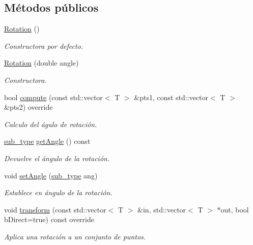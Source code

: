 \subsection*{Métodos públicos}
\begin{DoxyCompactItemize}
\item 
\hyperlink{class_i3_d_1_1_rotation_aa256156103083742ff0b09e274302a02}{Rotation} ()
\begin{DoxyCompactList}\small\item\em Constructora por defecto. \end{DoxyCompactList}\item 
\hyperlink{class_i3_d_1_1_rotation_a76e534145c6f6c81b3d519d97b3d9353}{Rotation} (double angle)
\begin{DoxyCompactList}\small\item\em Constructora. \end{DoxyCompactList}\item 
bool \hyperlink{group__trf2_d_group_gae7637f88523deb1879cf8a712820d12e}{compute} (const std\+::vector$<$ T $>$ \&pts1, const std\+::vector$<$ T $>$ \&pts2) override
\begin{DoxyCompactList}\small\item\em Calculo del águlo de rotación. \end{DoxyCompactList}\item 
\hyperlink{class_i3_d_1_1_transform_ac087b4b8b9acb1b11a6caa2231d598c7}{sub\+\_\+type} \hyperlink{class_i3_d_1_1_rotation_ae7c5193c2f47f782b8707fd8cc02078f}{get\+Angle} () const 
\begin{DoxyCompactList}\small\item\em Devuelve el ángulo de la rotación. \end{DoxyCompactList}\item 
void \hyperlink{group__trf2_d_group_gacc531b7f0f00dd34f197a5c9ba07b8e2}{set\+Angle} (\hyperlink{class_i3_d_1_1_transform_ac087b4b8b9acb1b11a6caa2231d598c7}{sub\+\_\+type} ang)
\begin{DoxyCompactList}\small\item\em Establece en ángulo de la rotación. \end{DoxyCompactList}\item 
void \hyperlink{group__trf2_d_group_ga0032788395928aa7419d506981ef03d3}{transform} (const std\+::vector$<$ T $>$ \&in, std\+::vector$<$ T $>$ $\ast$out, bool b\+Direct=true) const  override
\begin{DoxyCompactList}\small\item\em Aplica una rotación a un conjunto de puntos. \end{DoxyCompactList}\item 

\end{DoxyCompactItemize}
